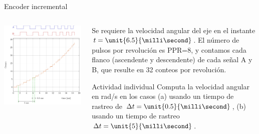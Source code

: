 \documentclass[presentation,aspectratio=169]{beamer}
\begin{document}
\begin{frame}[label={sec:org74ebfeb}]{Encoder incremental}
\begin{columns}
\begin{column}{0.5\columnwidth}
\begin{center}
\includegraphics[width=\textwidth]{../../figures/encoder-signals-nonuniform}
\end{center}
\end{column}
\begin{column}{0.5\columnwidth}
Se requiere la velocidad angular del eje en el instante \(t=\unit{6.5}{\milli\second}\). El número de pulsos por revolución es PPR=8, y contamos cada flanco (ascendente y descendente) de cada señal A y B, que resulte en 32 conteos por revolución.

\alert{Actividad individual} Computa la velocidad angular en rad/s en los casos \alert{(a)} usando un tiempo de rastreo de \(\Delta t=\unit{0.5}{\milli\second}\), \alert{(b)} usando un tiempo de rastreo \(\Delta t=\unit{5}{\milli\second}\).
\end{column}
\end{columns}
\end{frame}
\end{document}
